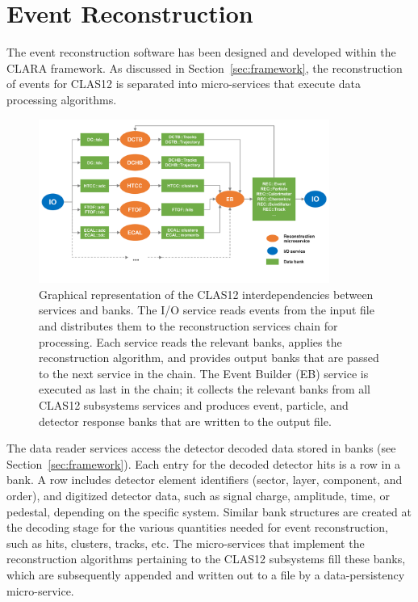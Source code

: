 \section{Event Reconstruction}
\label{sec:recon}

The event reconstruction software has been designed and developed within the CLARA framework. As discussed
in Section~\ref{sec:framework}, the reconstruction of events for CLAS12 is separated into micro-services that
execute data processing algorithms.

\begin{figure}
\centering
\includegraphics[width=0.85\textwidth]{pics/ServiceComposition.pdf}
\caption{Graphical representation of the CLAS12 interdependencies between services and banks. The I/O service
  reads events from the input file and distributes them to the reconstruction services chain for processing. Each
  service reads the relevant banks, applies the reconstruction algorithm, and provides output banks that are passed
  to the next service in the chain. The Event Builder (EB) service is executed as last in the chain; it collects the
  relevant banks from all CLAS12 subsystems services and produces event, particle, and detector response banks
  that are written to the output file.}
\label{fig:services}
\end{figure}

The data reader services access the detector decoded data stored in banks (see Section~\ref{sec:framework}).
Each entry for the decoded detector hits is a row in a bank. A row includes detector element identifiers (sector,
layer, component, and order), and digitized detector data, such as signal charge, amplitude, time, or pedestal,
depending on the specific system. Similar bank structures are created at the decoding stage for the various
quantities needed for event reconstruction, such as hits, clusters, tracks, etc. The micro-services that implement
the reconstruction algorithms pertaining to the CLAS12 subsystems fill these banks, which are subsequently
appended and written out to a file by a data-persistency micro-service.

